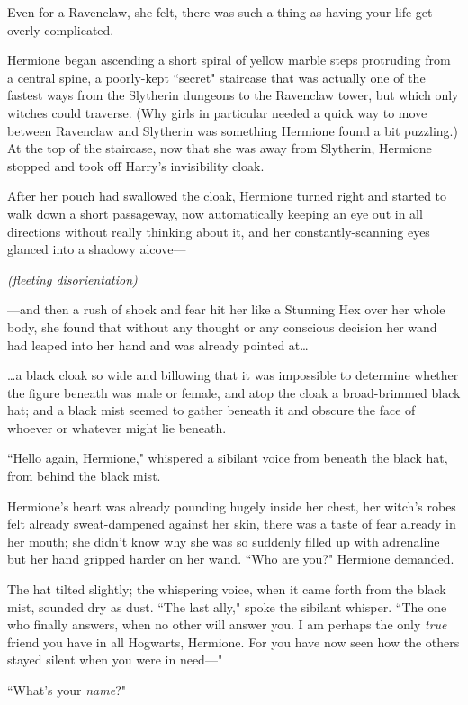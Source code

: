 Even for a Ravenclaw, she felt, there was such a thing as having your life get overly complicated.

Hermione began ascending a short spiral of yellow marble steps protruding from a central spine, a poorly-kept ``secret" staircase that was actually one of the fastest ways from the Slytherin dungeons to the Ravenclaw tower, but which only witches could traverse. (Why girls in particular needed a quick way to move between Ravenclaw and Slytherin was something Hermione found a bit puzzling.) At the top of the staircase, now that she was away from Slytherin, Hermione stopped and took off Harry's invisibility cloak.

After her pouch had swallowed the cloak, Hermione turned right and started to walk down a short passageway, now automatically keeping an eye out in all directions without really thinking about it, and her constantly-scanning eyes glanced into a shadowy alcove—

\emph{(fleeting disorientation)}

—and then a rush of shock and fear hit her like a Stunning Hex over her whole body, she found that without any thought or any conscious decision her wand had leaped into her hand and was already pointed at{\ldots}

{\ldots}a black cloak so wide and billowing that it was impossible to determine whether the figure beneath was male or female, and atop the cloak a broad-brimmed black hat; and a black mist seemed to gather beneath it and obscure the face of whoever or whatever might lie beneath.

``Hello again, Hermione," whispered a sibilant voice from beneath the black hat, from behind the black mist.

Hermione's heart was already pounding hugely inside her chest, her witch's robes felt already sweat-dampened against her skin, there was a taste of fear already in her mouth; she didn't know why she was so suddenly filled up with adrenaline but her hand gripped harder on her wand. ``Who are you?" Hermione demanded.

The hat tilted slightly; the whispering voice, when it came forth from the black mist, sounded dry as dust. ``The last ally," spoke the sibilant whisper. ``The one who finally answers, when no other will answer you. I am perhaps the only \emph{true} friend you have in all Hogwarts, Hermione. For you have now seen how the others stayed silent when you were in need—"

``What's your \emph{name}?"

